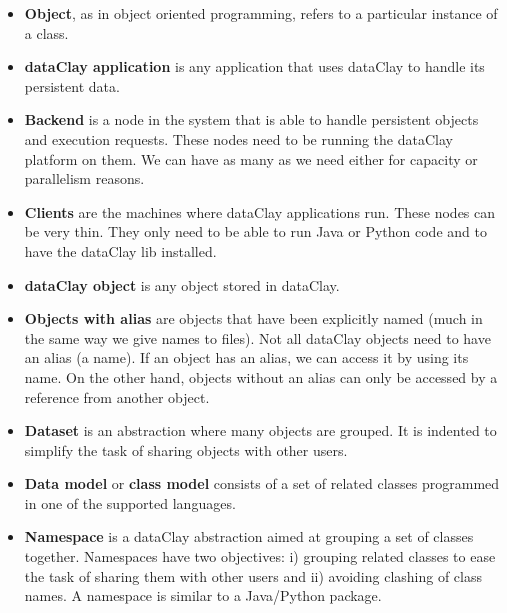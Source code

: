 \begin{itemize}

\item {\bf Object}, as in object oriented programming, refers to a particular instance of a class.

\item {\bf dataClay application} is any application that uses dataClay to handle its persistent data. 

\item {\bf Backend} is a node in the system that is able to handle persistent objects and execution requests. These nodes need to be running the dataClay platform on them. We can have as many as we need either for capacity or parallelism reasons.

\item {\bf Clients} are the machines where dataClay applications run. These nodes can be very thin. They only need to be able to run Java or Python code and to have the dataClay lib installed.

\item {\bf dataClay object} is any object stored in dataClay.

\item {\bf Objects with alias} are objects that have been explicitly named (much in the same way we give names to files). Not all dataClay objects need to have an alias (a name). If an object has an alias, we can access it by using its name. On the other hand, objects without an alias can only be accessed by a reference from another object. 

\item {\bf Dataset} is an abstraction where many objects are grouped. It is indented to simplify the task of sharing objects with other users.

\item {\bf Data model} or \textbf{class model} consists of a set of related classes programmed in one of the supported languages.

\item {\bf Namespace}  is a dataClay abstraction aimed at grouping a set of classes together. Namespaces have two objectives: i) grouping related classes to ease the task of sharing them with other users and ii) avoiding clashing of class names. A namespace is similar to a Java/Python package.

\end{itemize}

